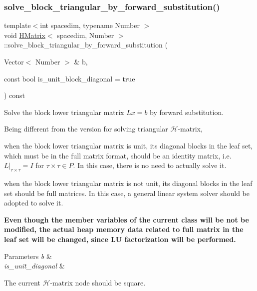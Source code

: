 \subsubsection{\texorpdfstring{solve\+\_\+block\+\_\+triangular\+\_\+by\+\_\+forward\+\_\+substitution()}{solve\_block\_triangular\_by\_forward\_substitution()}\hspace{0.1cm}{\footnotesize\ttfamily [1/2]}}
{\footnotesize\ttfamily template$<$int spacedim, typename Number $>$ \\
void \hyperlink{classHMatrix}{H\+Matrix}$<$ spacedim, Number $>$\+::solve\+\_\+block\+\_\+triangular\+\_\+by\+\_\+forward\+\_\+substitution (\begin{DoxyParamCaption}\item[{Vector$<$ Number $>$ \&}]{b,  }\item[{const bool}]{is\+\_\+unit\+\_\+block\+\_\+diagonal = {\ttfamily true} }\end{DoxyParamCaption}) const}

Solve the block lower triangular matrix $Lx=b$ by forward substitution.

Being different from the version for solving triangular $\mathcal{H}$-\/matrix,


\begin{DoxyEnumerate}
\item when the block lower triangular matrix is unit, its diagonal blocks in the leaf set, which must be in the full matrix format, should be an identity matrix, i.\+e. $L\vert_{\tau\times\tau} = I$ for $\tau\times\tau \in P$. In this case, there is no need to actually solve it.
\item when the block lower triangular matrix is not unit, its diagonal blocks in the leaf set should be full matrices. In this case, a general linear system solver should be adopted to solve it.
\end{DoxyEnumerate}

{\bfseries Even though the member variables of the current class will be not be modified, the actual heap memory data related to full matrix in the leaf set will be changed, since LU factorization will be performed.}


\begin{DoxyParams}{Parameters}
{\em b} & \\
\hline
{\em is\+\_\+unit\+\_\+diagonal} & \\
\hline
\end{DoxyParams}
The current $\mathcal{H}$-\/matrix node should be square.

